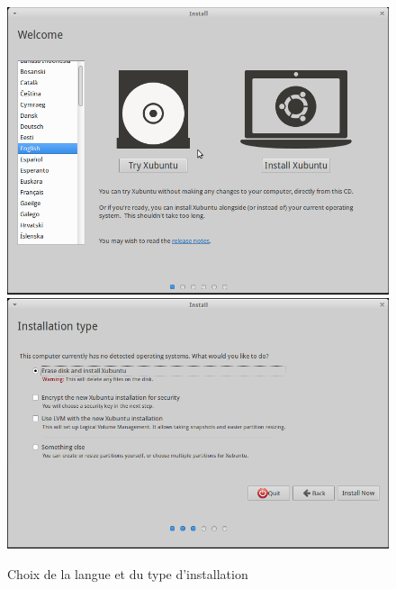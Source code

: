 \begin{figure}[h]
 \includegraphics[scale=0.38]{img/install/Xub_inst_1.png}
 \includegraphics[scale=0.38]{img/install/Xub_inst_2.png}
 \caption{Choix de la langue et du type d'installation}
 \end{figure}
